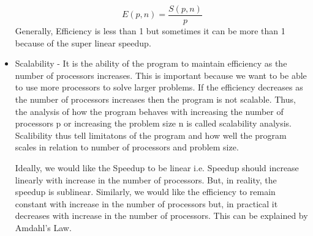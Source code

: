 \documentclass[12pt]{article}
\begin{document}
\begin{itemize}
    \[ E(p,n)=\dfrac{S(p,n)}{p}\]
    Generally, Efficiency is less than 1 but sometimes it can be more than 1 because of the super linear speedup.
    \item Scalability - It is the ability of the program to maintain efficiency as the number of processors increases. This is important because we want to be able to use more processors to solve larger problems. If the efficiency decreases as the number of processors increases then the program is not scalable. 
    Thus, the analysis of how the program behaves with increasing the number of processors p or increasing the problem size n is called scalability analysis. Scalibility thus tell limitatons of the program and how well the program scales in relation to number of processors and problem size.

    Ideally, we would like the Speedup to be linear i.e. Speedup should increase linearly with increase in the number of processors. But, in reality, the speedup is sublinear.
    Similarly, we would like the efficiency to remain constant with increase in the number of processors but, in practical it decreases with increase in the number of processors.
    This can be explained by Amdahl's Law.


\end{itemize}
\end{document}
